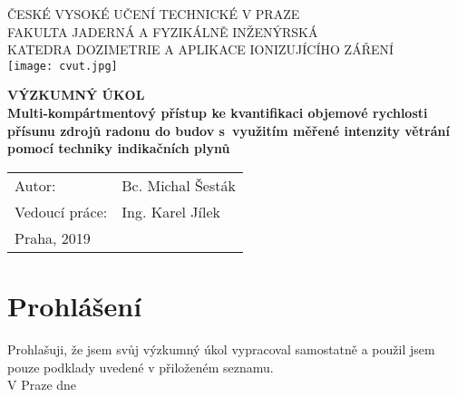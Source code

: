 \begin{center}
{\LARGE ČESKÉ VYSOKÉ UČENÍ TECHNICKÉ V PRAZE\\}
	\vspace{10pt}
{\large FAKULTA JADERNÁ A FYZIKÁLNĚ INŽENÝRSKÁ\\}
{\large KATEDRA DOZIMETRIE A APLIKACE IONIZUJÍCÍHO ZÁŘENÍ\\}
	\vspace{40pt}
    \texttt{[image: cvut.jpg]}

	\vspace{40pt}
{\Huge \textbf{VÝZKUMNÝ ÚKOL\\}}
	\vspace{10pt}
{\LARGE \textbf{Multi-kompártmentový přístup ke kvantifikaci  objemové rychlosti přísunu zdrojů radonu do budov s využitím měřené intenzity větrání pomocí techniky indikačních plynů\\}}
	\vspace{150pt}

\end{center}
{\large
\begin{tabular}{p{4cm} p{8cm}}
Autor: & Bc. Michal Šesták\\
Vedoucí práce: & Ing. Karel Jílek\\
Praha, 2019 & \\
\end{tabular}
}
%
\newpage
\vspace*{\fill}
\section*{Prohlášení}
Prohlašuji, že jsem svůj výzkumný úkol vypracoval samostatně a použil jsem pouze podklady uvedené v přiloženém seznamu.\\[10pt]
V Praze dne \\[10pt]
\newpage
\vspace*{\fill}
